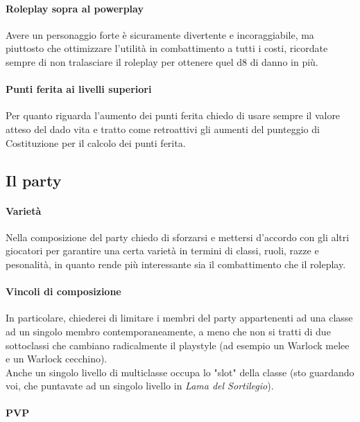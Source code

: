 \paragraph{Roleplay sopra al powerplay}

Avere un personaggio forte è sicuramente divertente e incoraggiabile, ma piuttosto che ottimizzare l'utilità in combattimento a tutti i costi, ricordate sempre di non tralasciare il roleplay per ottenere quel d8 di danno in più.

\paragraph{Punti ferita ai livelli superiori}

Per quanto riguarda l'aumento dei punti ferita chiedo di usare sempre il valore atteso del dado vita e tratto come retroattivi gli aumenti del punteggio di Costituzione per il calcolo dei punti ferita.

\subsection{Il party}

\paragraph{Varietà}

Nella composizione del party chiedo di sforzarsi e mettersi d'accordo con gli altri giocatori per garantire una certa varietà in termini di classi, ruoli, razze e pesonalità, in quanto rende più interessante sia il combattimento che il roleplay.

\paragraph{Vincoli di composizione}

In particolare, chiederei di limitare i membri del party appartenenti ad una classe ad un singolo membro contemporaneamente, a meno che non si tratti di due sottoclassi che cambiano radicalmente il playstyle (ad esempio un Warlock melee e un Warlock cecchino). \\ Anche un singolo livello di multiclasse occupa lo "slot" della classe (sto guardando voi, che puntavate ad un singolo livello in \textit{Lama del Sortilegio}).

\paragraph{PVP}


